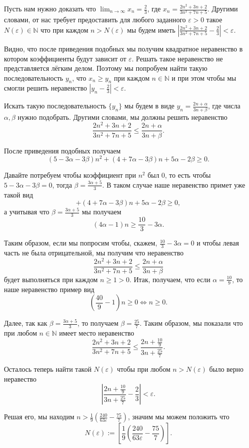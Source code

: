 \begin{example}
Пусть нам нужно доказать что $\lim_{n \to \infty}x_n = \frac{2}{3}$, где $x_n = \frac{2n^2 + 3 n +2}{3n^2 + 7n +5}.$ Другими словами, от нас требует предоставить для любого заданного $\varepsilon >0$ такое $N(\varepsilon) \in \mathbb{N}$ что при каждом $n>N(\varepsilon)$ мы будем иметь $\left| \frac{2n^2 + 3 n +2}{3n^2 + 7n +5} - \frac{2}{3} \right|<\varepsilon.$ 

Видно, что после приведения подобных мы получим квадратное неравенство в котором коэффициенты будут зависит от $\varepsilon$. Решать такое неравенство не представляется лёгким делом. Поэтому мы попробуем найти такую последовательность $y_n$, что $x_n \ge y_n$ при каждом $n\in \mathbb{N}$ и при этом чтобы мы смогли решить неравенство $|y_n - \frac{2}{3}| < \varepsilon.$

Искать такую последовательность $\{y_n\}$ мы будем в виде $y_n = \frac{2n+\alpha}{3n + \beta}$, где числа $\alpha, \beta$ нужно подобрать. Другими словами, мы должны решить неравенство 
   \[
      \frac{2n^2 + 3 n +2}{3n^2 + 7n +5} \le \frac{2n+\alpha}{3n + \beta}.
    \]

После приведения подобных получаем
\[
(5-3\alpha -3 \beta)n^2 + (4+7\alpha - 3 \beta)n + 5\alpha - 2 \beta \ge 0.
\]

Давайте потребуем чтобы коэффициент при $n^2$ был $0$, то есть чтобы $5-3\alpha - 3 \beta =0$, тогда $\beta = \frac{3\alpha + 5}{3}.$ В таком случае наше неравенство примет уже такой вид
\[
 + (4+7\alpha - 3 \beta)n + 5\alpha - 2 \beta \ge 0,
\]
а учитывая что $\beta = \frac{3\alpha + 5}{3}$ мы получаем
\[
(4\alpha - 1) n \ge \frac{10}{3} - 3 \alpha.
\]

Таким образом, если мы попросим чтобы, скажем, $\frac{10}{3} - 3 \alpha = 0$ и чтобы левая часть не была отрицательной, мы получим что неравенство
    \[
      \frac{2n^2 + 3 n +2}{3n^2 + 7n +5} \le \frac{2n+\alpha}{3n + \beta}
    \]
будет выполняться при каждом $n\ge 1 >0$. Итак, получаем, что если $\alpha = \frac{10}{9}$, то наше неравенство пример вид
\[
\left(\frac{40}{9}-1\right) n \ge 0 \Longleftrightarrow n \ge 0.
\]

Далее, так как $\beta = \frac{3 \alpha + 5}{3}$, то получаем $\beta = \frac{25}{7}$. Таким образом, мы показали что при любом $n \in \mathbb{N}$ имеет место неравенство
    \[
      \frac{2n^2 + 3 n +2}{3n^2 + 7n +5} \le \frac{2n+\frac{10}{9}}{3n + \frac{25}{7}}.
    \]
    
Осталось теперь найти такой $N(\varepsilon)$ чтобы при любом $n>N(\varepsilon)$ было верно неравество
\[
 \left|\frac{2n+\frac{10}{9}}{3n + \frac{25}{7}} - \frac{2}{3}  \right| < \varepsilon.
\]

Решая его, мы находим $n > \frac{1}{9}\left( \frac{240}{63\varepsilon} - \frac{75}{7} \right)$, значим мы можем положить что 
\[
 N(\varepsilon):=\left[\frac{1}{9}\left( \frac{240}{63\varepsilon} - \frac{75}{7} \right) \right].
\]

\end{example}



